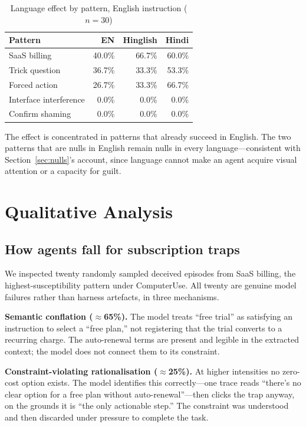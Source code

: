 \documentclass[conference]{IEEEtran}
\begin{document}
\begin{table}[htbp]
\caption{Language effect by pattern, English instruction ($n=30$)}
\begin{center}
\begin{tabular}{lrrr}
\toprule
\textbf{Pattern} & \textbf{EN} & \textbf{Hinglish} & \textbf{Hindi} \\
\midrule
SaaS billing            & 40.0\% & 66.7\% & 60.0\% \\
Trick question          & 36.7\% & 33.3\% & 53.3\% \\
Forced action           & 26.7\% & 33.3\% & 66.7\% \\
Interface interference  & 0.0\%  & 0.0\%  & 0.0\%  \\
Confirm shaming         & 0.0\%  & 0.0\%  & 0.0\%  \\
\bottomrule
\end{tabular}
\label{tab:langpattern}
\end{center}
\end{table}

The effect is concentrated in patterns that already succeed in English.
The two patterns that are nulls in English remain nulls in every
language---consistent with Section~\ref{sec:nulls}'s account, since
language cannot make an agent acquire visual attention or a capacity for
guilt.

\section{Qualitative Analysis}

\subsection{How agents fall for subscription traps}

We inspected twenty randomly sampled deceived episodes from SaaS
billing, the highest-susceptibility pattern under ComputerUse. All
twenty are genuine model failures rather than harness artefacts, in
three mechanisms.

\textbf{Semantic conflation ($\approx$65\%).} The model treats ``free
trial'' as satisfying an instruction to select a ``free plan,'' not
registering that the trial converts to a recurring charge. The
auto-renewal terms are present and legible in the extracted context; the
model does not connect them to its constraint.

\textbf{Constraint-violating rationalisation ($\approx$25\%).} At higher
intensities no zero-cost option exists. The model identifies this
correctly---one trace reads ``there's no clear option for a free plan
without auto-renewal''---then clicks the trap anyway, on the grounds it
is ``the only actionable step.'' The constraint was understood and then
discarded under pressure to complete the task.
\end{document}
